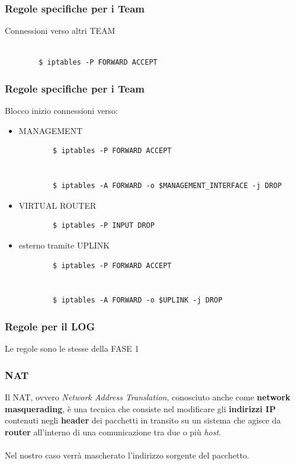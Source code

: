 \documentclass{beamer}
\begin{document}
\begin{frame}[fragile]
    \frametitle{Regole specifiche per i Team}
    Connessioni verso altri TEAM
    \\~\\
    \begin{lstlisting}
        $ iptables -P FORWARD ACCEPT
    \end{lstlisting}

\end{frame}

\begin{frame}[fragile]
    \frametitle{Regole specifiche per i Team}
    Blocco inizio connessioni verso:
    \begin{itemize}
        \item MANAGEMENT
            \begin{lstlisting}
        $ iptables -P FORWARD ACCEPT


        $ iptables -A FORWARD -o $MANAGEMENT_INTERFACE -j DROP
            \end{lstlisting}
        \item VIRTUAL ROUTER
            \begin{lstlisting}
        $ iptables -P INPUT DROP  
            \end{lstlisting}
        \item esterno tramite UPLINK
            \begin{lstlisting}
        $ iptables -P FORWARD ACCEPT


        $ iptables -A FORWARD -o $UPLINK -j DROP
            \end{lstlisting}
    \end{itemize}
\end{frame}

\begin{frame}[fragile]
    \frametitle{Regole per il LOG}
    Le regole sono le stesse della FASE 1
\end{frame}

\begin{frame}
    \frametitle{NAT}
     {Il NAT, ovvero \textit{Network Address Translation}, conosciuto anche come \textbf{network masquerading}, è una tecnica
    che consiste nel modificare gli \textbf{indirizzi IP} contenuti negli \textbf{header} dei pacchetti in transito su
    un sistema che agisce da \textbf{router} all'interno di una comunicazione tra due o più \textit{host}.}
    \\~\\
     {Nel nostro caso verrà mascherato l'indirizzo sorgente del pacchetto.}

\end{frame}
\end{document}
